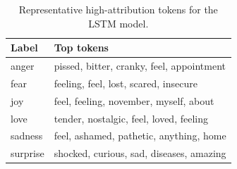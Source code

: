 \begin{table}
\caption{Representative high-attribution tokens for the LSTM model.}
\label{tab:lstm-token-attribution}
\begin{tabular}{ll}
\toprule
Label & Top tokens \\
\midrule
anger & pissed, bitter, cranky, feel, appointment \\
fear & feeling, feel, lost, scared, insecure \\
joy & feel, feeling, november, myself, about \\
love & tender, nostalgic, feel, loved, feeling \\
sadness & feel, ashamed, pathetic, anything, home \\
surprise & shocked, curious, sad, diseases, amazing \\
\bottomrule
\end{tabular}
\end{table}
